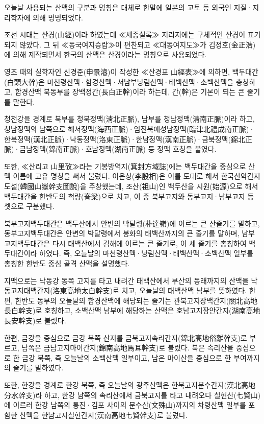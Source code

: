 \documentclass[12pt,a4paper]{book}
\begin{document}
오늘날 사용되는 산맥의 구분과 명칭은 대체로 한말에 일본의 고토 등 외국인 지질·지리학자에 의해 명명되었다. 


조선 시대는 산경(山經)이라 하였는데 ≪세종실록≫ 지리지에는 구체적인 산경이 표기되지 않았다. 그 뒤 ≪동국여지승람≫이 편찬되고 ≪대동여지도≫가 김정호(金正浩)에 의해 제작되면서 한국의 산맥은 산경이라는 명칭으로 사용되었다.

영조 때의 실학자인 신경준(申景濬)이 작성한 ≪산경표 山經表≫에 의하면, 백두대간(白頭大幹)은 마천령산맥·함경산맥·서남부낭림산맥·태백산맥·소백산맥을 총칭하고, 함경산맥 북동부를 장백정간(長白正幹)이라 하는데, 간(幹)은 기본이 되는 큰 줄기를 말한다.

청천강을 경계로 북부를 청북정맥(淸北正脈), 남부를 청남정맥(淸南正脈)이라 하고, 청남정맥의 남쪽으로 해서정맥(海西正脈)·임진북예성남정맥(臨津北禮成南正脈)·한북정맥(漢北正脈)·낙동정맥(洛東正脈)·한남정맥(漢南正脈)·금북정맥(錦北正脈)·금남정맥(錦南正脈)·호남정맥(湖南正脈) 등 정맥 호칭을 붙였다.

또한, ≪산리고 山里攷≫라는 기봉방역지(箕封方域誌)에는 백두대간을 중심으로 산맥 이름에 고유 명칭을 써서 불렀다. 이은상(李殷相)은 이를 토대로 해서 한국산악간지도설(韓國山嶽幹支圖說)을 주창했는데, 조산(祖山)인 백두산을 시원(始源)으로 해서 백두대간을 한반도의 척량(脊梁)으로 치고, 이 중 북부고지와 동부고지·남부고지 등 셋으로 구분했다.

북부고지백두대간은 백두산에서 안변의 박달령(朴達嶺)에 이르는 큰 산줄기를 말하고, 동부고지백두대간은 안변의 박달령에서 봉화의 태백산까지의 큰 줄기를 말하며, 남부고지백두대간은 다시 태백산에서 김해에 이르는 큰 줄기로, 이 세 줄기를 총칭하여 백두대간이라 하였다. 즉, 오늘날의 마천령산맥·낭림산맥·태백산맥·소백산맥 일부를 총칭한 한반도 중심 골격 산맥을 설명했다.

지맥으로는 낙동강 동쪽 고지를 타고 내려간 태백산에서 부산의 동래까지의 산맥을 낙동고지태백간지(洛東高地太白幹支)로 치고, 오늘날의 태백산맥 남부를 뜻하였다. 한편, 한반도 동부의 오늘날의 함경산맥에 해당되는 줄기는 관북고지장백간지(關北高地長白幹支)로 호칭하고, 소백산맥 남부에 해당하는 산맥은 호남고지장안간지(湖南高地長安幹支)로 불렀다.

한편, 금강을 중심으로 금강 북쪽 산지를 금북고지속리간지(錦北高地俗離幹支)로 부르고, 남쪽은 금남고지마이간지(錦南高地馬耳幹支)로 불렀다. 북은 속리산을 중심으로 한 금강 북쪽, 즉 오늘날의 소백산맥 일부이고, 남은 마이산을 중심으로 한 부여까지의 줄기를 말하였다.

또한, 한강을 경계로 한강 북쪽, 즉 오늘날의 광주산맥은 한북고지분수간지(漢北高地分水幹支)라 하고, 한강 남쪽의 속리산에서 금북고지를 타고 내려오다 칠현산(七賢山)에 이르러 한강 남쪽의 통진·김포 사이의 문수산(文殊山)까지의 차령산맥 일부를 포함한 산맥을 한남고지칠현간지(漢南高地七賢幹支)로 불렀다.
\end{document}
